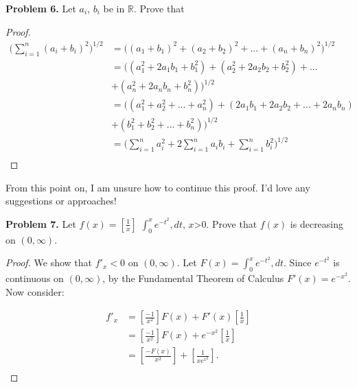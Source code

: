 \documentclass[12pt]{article}
\begin{document}
\begin{flushleft}\textbf{Problem 6.} Let $a_{i}$, $b_{i}$ be in $\mathbb{R}$. Prove that 

\vspace{.2cm}


\vspace{.2cm}

\begin{proof}
\begin{align*}
\big(\sum_{i=1}^{n} (a_{i}+b_{i})^{2}\big)^{1/2} 
	&= \big( (a_{1}+b_{1})^{2} + (a_{2}+b_{2})^{2}+...+(a_{n}+b_{n})^{2}\big)^{1/2} \\
	&= \big( (a_{1}^{2}+2a_{1}b_{1}+b_{1}^{2}) + (a_{2}^{2}+2a_{2}b_{2}+b_{2}^{2})+...\\
	&+ (a_{n}^{2}+2a_{n}b_{n}+b_{n}^{2}) \big)^{1/2} \\
	&= \big( (a_{1}^{2}+a_{2}^{2}+...+a_{n}^{2}) + (2a_{1}b_{1}+2a_{2}b_{2}+...+2a_{n}b_{n}) \\ &+ (b_{1}^{2}+b_{2}^{2}+...+b_{n}^{2}) \big)^{1/2} \\
	&= \big( \sum_{i=1}^{n} a_{i}^{2} + 2\sum_{i=1}^{n} a_{i}b_{i} + \sum_{i=1}^{n} b_{i}^{2} \big)^{1/2} \\
\end{align*}
\end{proof}
\color{red} From this point on, I am unsure how to continue this proof. I'd love any suggestions or approaches!


\vspace{.2cm} 

\color{black}

\textbf{Problem 7.} Let $f(x)=[\frac{1}{x}]$  $\int_{0}^{x} e^{-t^{2}}, dt$, $x$>0. Prove that $f(x)$ is decreasing on $(0, \infty)$. 

\vspace{.2cm}

\begin{proof} 
We show that $f'_{x}<0$ on $(0, \infty)$. Let $F(x)= \int_{0}^{x} e^{-t^{2}}, dt$. Since $e^{-t^{2}}$ is continuous on $(0, \infty)$, by the Fundamental Theorem of Calculus $F'(x)=e^{-x^{2}}$. Now consider:

\begin{align*}
f'_{x} &= [\frac{-1}{x^{2}}]F(x) + F'(x)[\frac{1}{x}] \\
	&= [\frac{-1}{x^{2}}]F(x) + e^{-x^{2}}[\frac{1}{x}] \\
	&= [\frac{-F(x)}{x^{2}}] + [\frac{1}{xe^{x^{2}}}]. \\
\end{align*}


\end{proof}
\end{flushleft}
\end{document}
